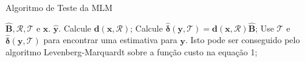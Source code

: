 \documentclass{beamer}
\begin{document}
\begin{frame}{Algoritmo de Teste da MLM}

	\begin{algorithm}[H]
	\caption{Algoritmo de Teste da MLM}\label{Alg:MLM_teste}
	\begin{algorithmic}[1]
	\REQUIRE $ \mathbf{ \widehat{B}}, \mathcal{R}, \mathcal{T}$ e $\mathbf{x}$.%
	\ENSURE $\mathbf{ \widehat{y} }$.%
	\STATE Calcule $\mathbf{d}(\mathbf{x},\mathcal{R}) $;%
	\STATE Calcule $\boldsymbol{ \widehat{\delta}}(\mathbf{y},\mathcal{T}) = \mathbf{d}(\mathbf{x},\mathcal{R})\mathbf{\widehat{B}}$;%
	\STATE Use $\mathcal{T}$ e $\boldsymbol{\widehat{\delta}}(\mathbf{y},\mathcal{T})$ para encontrar uma estimativa para $\mathbf{y}$. Isto pode ser conseguido pelo algoritmo Levenberg-Marquardt sobre a função custo na equação 1;%
	\end{algorithmic}
	\end{algorithm}

\end{frame}


\end{document}
